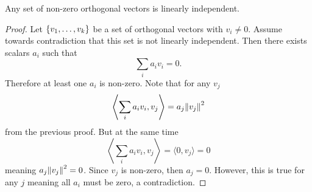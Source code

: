 \documentclass{subfiles}
\begin{document}
\begin{theorem}
    Any set of non-zero orthogonal vectors is linearly independent.
\end{theorem}

\begin{proof}
    Let $\qty{v_1, \ldots, v_k}$ be a set of orthogonal vectors with $v_i \neq 0$. Assume towards contradiction that this set is not linearly independent. Then there exists scalars $a_i$ such that
    \[
        \sum_i a_i v_i = 0
    .\]
    Therefore at least one $a_i$ is non-zero. Note that for any $v_j$
    \[
        \left\langle \sum_i a_i v_i, v_j \right\rangle = a_j \norm{v_j}^2
    \]
    from the previous proof. But at the same time
    \[
        \left\langle \sum_i a_i v_i, v_j \right\rangle = \langle 0, v_j \rangle = 0
    \]
    meaning $a_j \norm{v_j}^2 = 0$. Since $v_j$ is non-zero, then $a_j = 0$. However, this is true for any $j$ meaning all $a_i$ must be zero, a contradiction.
\end{proof}
\end{document}

